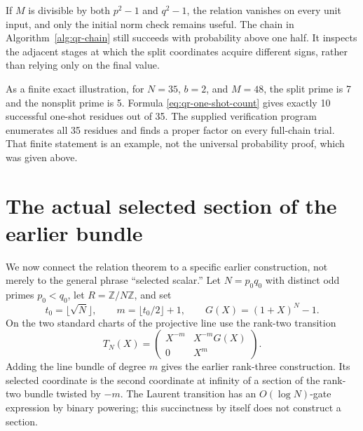 If $M$ is divisible by both $p^2-1$ and $q^2-1$, the relation vanishes
on every unit input, and only the initial norm check remains useful.
The chain in Algorithm~\ref{alg:qr-chain} still succeeds with
probability above one half.  It inspects the adjacent stages at which
the split coordinates acquire different signs, rather than relying
only on the final value.

As a finite exact illustration, for $N=35$, $b=2$, and $M=48$, the
split prime is 7 and the nonsplit prime is 5.
Formula \eqref{eq:qr-one-shot-count} gives exactly 10 successful
one-shot residues out of 35.  The supplied verification program
enumerates all 35 residues and finds a proper factor on every full-chain
trial.  That finite statement is an example, not the universal
probability proof, which was given above.

\section{The actual selected section of the earlier bundle}
\label{sec:qr-section}

We now connect the relation theorem to a specific earlier construction,
not merely to the general phrase ``selected scalar.''
Let $N=p_0q_0$ with distinct odd primes $p_0<q_0$, let
$R=\mathbb Z/N\mathbb Z$, and set
\[
 t_0=\lfloor\sqrt N\rfloor,
 \qquad m=\lfloor t_0/2\rfloor+1,
 \qquad G(X)=(1+X)^N-1.
\]
On the two standard charts of the projective line use the rank-two
transition
\begin{equation}
 T_N(X)=\begin{pmatrix}X^{-m}&X^{-m}G(X)\\0&X^m\end{pmatrix}.
 \label{eq:qr-bundle}
\end{equation}
Adding the line bundle of degree $m$ gives the earlier rank-three
construction.  Its selected coordinate is the second coordinate at
infinity of a section of the rank-two bundle twisted by $-m$.
The Laurent transition has an $O(\log N)$-gate expression by binary
powering; this succinctness by itself does not construct a section.

